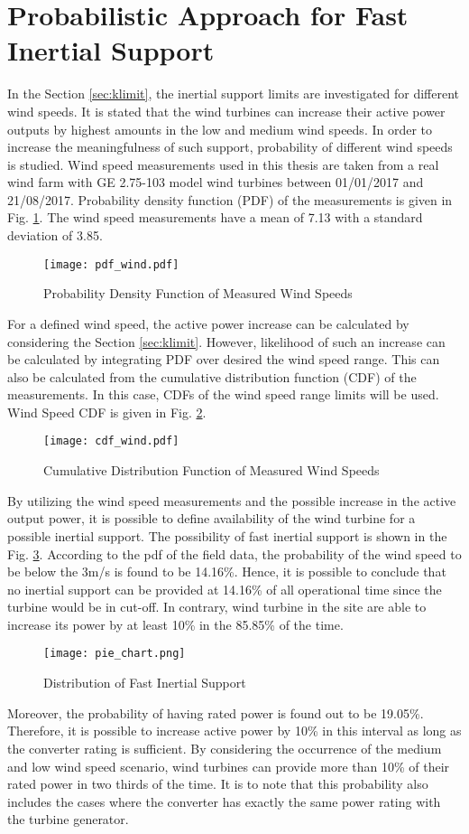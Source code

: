 \section{Probabilistic Approach for Fast Inertial Support}
In the Section \ref{sec:klimit}, the inertial support limits are investigated for different wind speeds. It is stated that the wind turbines can increase their active power outputs by highest amounts in the low and medium wind speeds. In order to increase the meaningfulness of such support, probability of different wind speeds is studied. Wind speed measurements used in this thesis are taken from a real wind farm with GE 2.75-103 model wind turbines between 01/01/2017 and 21/08/2017. Probability density function (PDF) of the measurements is given in Fig. \ref{windpdf}. The wind speed measurements have a mean of 7.13 with a standard deviation of 3.85.\par
\begin{figure}[h!]
	\centering
	\texttt{[image: pdf\_wind.pdf]}
	\caption{Probability Density Function of Measured Wind Speeds}
	\label{windpdf}
\end{figure}
For a defined wind speed, the active power increase can be calculated by considering the Section \ref{sec:klimit}. However, likelihood of such an increase can be calculated by integrating PDF over desired the wind speed range. This can also be calculated from the cumulative distribution function (CDF) of the measurements. In this case, CDFs of the wind speed range limits will be used. Wind Speed CDF is given in Fig. \ref{windcdf}. \par
\begin{figure}[h!]
	\centering
	\texttt{[image: cdf\_wind.pdf]}
	\caption{Cumulative Distribution Function of Measured Wind Speeds}
	\label{windcdf}
\end{figure}
By utilizing the wind speed measurements and the possible increase in the active output power, it is possible to define availability of the wind turbine for a possible inertial support. The possibility of fast inertial support is shown in the Fig. \ref{wind_pie}. According to the pdf of the field data, the probability of the wind speed to be below the 3m/s is found to be 14.16\%. Hence, it is possible to conclude that no inertial support can be provided at 14.16\% of all operational time since the turbine would be in cut-off. In contrary, wind turbine in the site are able to increase its power by at least 10\% in the 85.85\% of the time.\par
\begin{figure}[h!]
	\centering
	\texttt{[image: pie\_chart.png]}
	\caption{Distribution of Fast Inertial Support}
	\label{wind_pie}
\end{figure}
Moreover, the probability of having rated power is found out to be 19.05\%. Therefore, it is possible to increase active power by 10\% in this interval as long as the converter rating is sufficient.  By considering the occurrence of the medium and low wind speed scenario, wind turbines can provide more than 10\% of their rated power in two thirds of the time. It is to note that this probability also includes the cases where the converter has exactly the same power rating with the turbine generator.